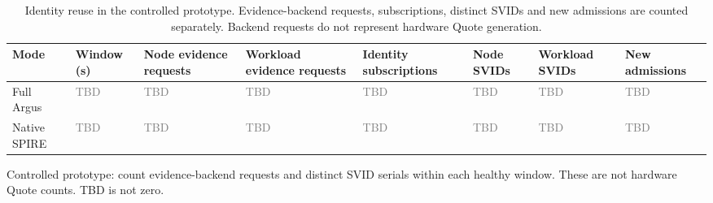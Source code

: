 \begin{table}[t]
\centering
\scriptsize
\setlength{\tabcolsep}{3pt}
\caption{Identity reuse in the controlled prototype. Evidence-backend requests, subscriptions, distinct SVIDs and new admissions are counted separately. Backend requests do not represent hardware Quote generation.}
\label{tab:argus-reuse}
\begin{tabularx}{\linewidth}{@{}Y Y Y Y Y Y Y Y@{}}
\toprule
\textbf{Mode} & \textbf{Window (s)} & \textbf{Node evidence requests} & \textbf{Workload evidence requests} & \textbf{Identity subscriptions} & \textbf{Node SVIDs} & \textbf{Workload SVIDs} & \textbf{New admissions} \\
\midrule
Full Argus & \textcolor{gray}{TBD} & \textcolor{gray}{TBD} & \textcolor{gray}{TBD} & \textcolor{gray}{TBD} & \textcolor{gray}{TBD} & \textcolor{gray}{TBD} & \textcolor{gray}{TBD} \\
Native SPIRE & \textcolor{gray}{TBD} & \textcolor{gray}{TBD} & \textcolor{gray}{TBD} & \textcolor{gray}{TBD} & \textcolor{gray}{TBD} & \textcolor{gray}{TBD} & \textcolor{gray}{TBD} \\
\bottomrule
\end{tabularx}\par\smallskip\footnotesize Controlled prototype: count evidence-backend requests and distinct SVID serials within each healthy window. These are not hardware Quote counts. TBD is not zero.
\end{table}